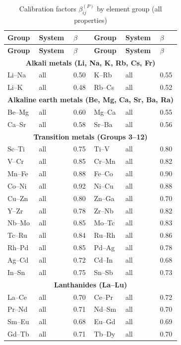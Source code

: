 \documentclass[12pt,a4paper]{article}
\begin{document}
	\begin{longtable}{p{2.5cm} p{2.5cm} p{1.2cm} p{2.5cm} p{2.5cm} p{1.2cm}}
		\caption{Calibration factors $\beta_{ij}^{(P)}$ by element group (all properties)}\label{tab:beta_group}\\
		\toprule
		\textbf{Group} & \textbf{System} & $\beta$ & \textbf{Group} & \textbf{System} & $\beta$ \\
		\midrule
		\endfirsthead
		\toprule
		\textbf{Group} & \textbf{System} & $\beta$ & \textbf{Group} & \textbf{System} & $\beta$ \\
		\midrule
		\endhead
		\multicolumn{6}{c}{\textbf{Alkali metals (Li, Na, K, Rb, Cs, Fr)}} \\
		Li–Na & all & 0.50 & K–Rb & all & 0.55 \\
		Li–K  & all & 0.48 & Rb–Cs & all & 0.52 \\
		\multicolumn{6}{c}{\textbf{Alkaline earth metals (Be, Mg, Ca, Sr, Ba, Ra)}} \\
		Be–Mg & all & 0.60 & Mg–Ca & all & 0.55 \\
		Ca–Sr & all & 0.58 & Sr–Ba & all & 0.56 \\
		\multicolumn{6}{c}{\textbf{Transition metals (Groups 3–12)}} \\
		Sc–Ti & all & 0.75 & Ti–V & all & 0.80 \\
		V–Cr  & all & 0.85 & Cr–Mn & all & 0.82 \\
		Mn–Fe & all & 0.88 & Fe–Co & all & 0.90 \\
		Co–Ni & all & 0.92 & Ni–Cu & all & 0.88 \\
		Cu–Zn & all & 0.80 & Zn–Ga & all & 0.70 \\
		Y–Zr  & all & 0.78 & Zr–Nb & all & 0.82 \\
		Nb–Mo & all & 0.85 & Mo–Tc & all & 0.83 \\
		Tc–Ru & all & 0.84 & Ru–Rh & all & 0.86 \\
		Rh–Pd & all & 0.85 & Pd–Ag & all & 0.78 \\
		Ag–Cd & all & 0.72 & Cd–In & all & 0.68 \\
		In–Sn & all & 0.75 & Sn–Sb & all & 0.73 \\
		\multicolumn{6}{c}{\textbf{Lanthanides (La–Lu)}} \\
		La–Ce & all & 0.70 & Ce–Pr & all & 0.72 \\
		Pr–Nd & all & 0.71 & Nd–Sm & all & 0.70 \\
		Sm–Eu & all & 0.68 & Eu–Gd & all & 0.69 \\
		Gd–Tb & all & 0.71 & Tb–Dy & all & 0.70 \\

\end{longtable}
\end{document}
